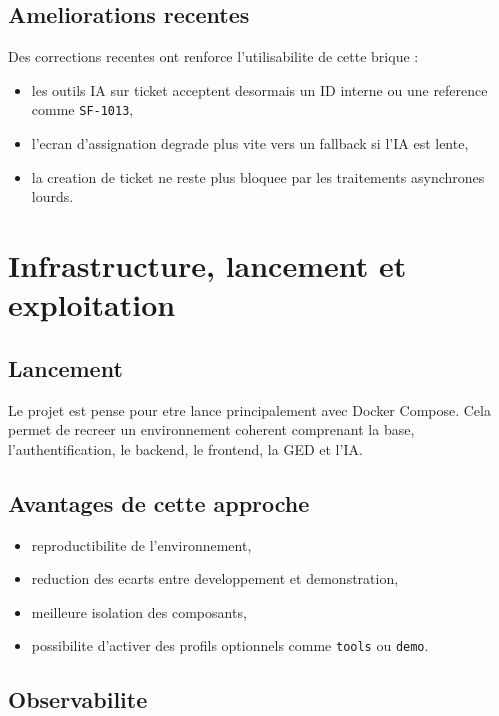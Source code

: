 \documentclass[12pt,a4paper]{article}
\begin{document}
\subsection{Ameliorations recentes}

Des corrections recentes ont renforce l'utilisabilite de cette brique :

\begin{itemize}[leftmargin=1.2cm]
  \item les outils IA sur ticket acceptent desormais un ID interne ou une reference comme \texttt{SF-1013},
  \item l'ecran d'assignation degrade plus vite vers un fallback si l'IA est lente,
  \item la creation de ticket ne reste plus bloquee par les traitements asynchrones lourds.
\end{itemize}

\section{Infrastructure, lancement et exploitation}

\subsection{Lancement}

Le projet est pense pour etre lance principalement avec Docker Compose. Cela permet de recreer un environnement coherent comprenant la base, l'authentification, le backend, le frontend, la GED et l'IA.

\subsection{Avantages de cette approche}

\begin{itemize}[leftmargin=1.2cm]
  \item reproductibilite de l'environnement,
  \item reduction des ecarts entre developpement et demonstration,
  \item meilleure isolation des composants,
  \item possibilite d'activer des profils optionnels comme \texttt{tools} ou \texttt{demo}.
\end{itemize}

\subsection{Observabilite}
\end{document}
